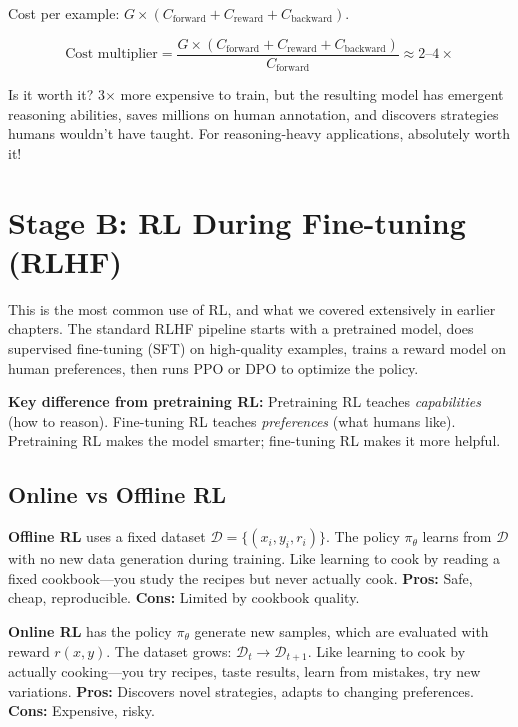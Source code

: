 \begin{chapterenv}
Cost per example: $G \times (C_{\text{forward}} + C_{\text{reward}} + C_{\text{backward}})$.

$$\text{Cost multiplier} = \frac{G \times (C_{\text{forward}} + C_{\text{reward}} + C_{\text{backward}})}{C_{\text{forward}}} \approx 2\text{--}4\times$$

\begin{tipbox}
Is it worth it? 3$\times$ more expensive to train, but the resulting model has emergent reasoning abilities, saves millions on human annotation, and discovers strategies humans wouldn't have taught. For reasoning-heavy applications, absolutely worth it!
\end{tipbox}

\section{Stage B: RL During Fine-tuning (RLHF)}

This is the most common use of RL, and what we covered extensively in earlier chapters. The standard RLHF pipeline starts with a pretrained model, does supervised fine-tuning (SFT) on high-quality examples, trains a reward model on human preferences, then runs PPO or DPO to optimize the policy.

\textbf{Key difference from pretraining RL:} Pretraining RL teaches \textit{capabilities} (how to reason). Fine-tuning RL teaches \textit{preferences} (what humans like). Pretraining RL makes the model smarter; fine-tuning RL makes it more helpful.

\subsection{Online vs Offline RL}

\begin{infobox}
\textbf{Offline RL} uses a fixed dataset $\mathcal{D} = \{(x_i, y_i, r_i)\}$. The policy $\pi_\theta$ learns from $\mathcal{D}$ with no new data generation during training. Like learning to cook by reading a fixed cookbook---you study the recipes but never actually cook. \textbf{Pros:} Safe, cheap, reproducible. \textbf{Cons:} Limited by cookbook quality.

\textbf{Online RL} has the policy $\pi_\theta$ generate new samples, which are evaluated with reward $r(x,y)$. The dataset grows: $\mathcal{D}_t \rightarrow \mathcal{D}_{t+1}$. Like learning to cook by actually cooking---you try recipes, taste results, learn from mistakes, try new variations. \textbf{Pros:} Discovers novel strategies, adapts to changing preferences. \textbf{Cons:} Expensive, risky.


\end{infobox}
\end{chapterenv}
